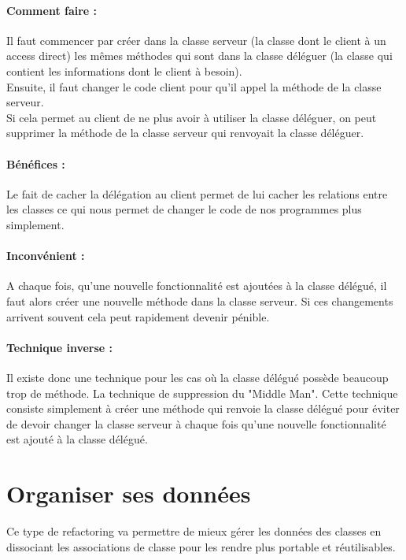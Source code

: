 \documentclass[a4paper,twoside,12pt,openright]{report}
\begin{document}
\paragraph{Comment faire :}
Il faut commencer par créer dans la classe serveur (la classe dont le client à un access direct) les mêmes méthodes qui sont dans la classe déléguer (la classe qui contient les informations dont le client à besoin).\\
Ensuite, il faut changer le code client pour qu'il appel la méthode de la classe serveur.\\
Si cela permet au client de ne plus avoir à utiliser la classe déléguer, on peut supprimer la méthode de la classe serveur qui renvoyait la classe déléguer.

\paragraph{Bénéfices :}
Le fait de cacher la délégation au client permet de lui cacher les relations entre les classes ce qui nous permet de changer le code de nos programmes plus simplement.

\paragraph{Inconvénient :}
A chaque fois, qu'une nouvelle fonctionnalité est ajoutées à la classe délégué, il faut alors créer une nouvelle méthode dans la classe serveur. Si ces changements arrivent souvent cela peut rapidement devenir pénible.

\paragraph{Technique inverse :}
Il existe donc une technique pour les cas où la classe délégué possède beaucoup trop de méthode.
La technique de suppression du "Middle Man".
Cette technique consiste simplement à créer une méthode qui renvoie la classe délégué pour éviter de devoir changer la classe serveur à chaque fois qu'une nouvelle fonctionnalité est ajouté à la classe délégué.\\


\newpage
\section{Organiser ses données}
Ce type de refactoring va permettre de mieux gérer les données des classes en dissociant les associations de classe pour les rendre plus portable et réutilisables.\\
\end{document}
